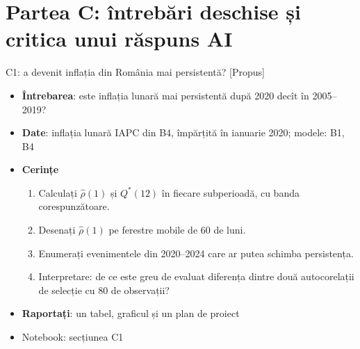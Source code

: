 \section{Partea C: întrebări deschise și critica unui răspuns AI}

\begin{frame}{C1: a devenit inflația din România mai persistentă? [Propus]}
\itemsize{\footnotesize}
\begin{itemize}
\item \textbf{Întrebarea}: este inflația lunară mai persistentă după 2020 decît în 2005--2019?
\item \textbf{Date}: inflația lunară IAPC din B4, împărțită în ianuarie 2020; modele: B1, B4
\item \textbf{Cerințe}
\begin{enumerate}
    \item Calculați $\hat\rho(1)$ și $Q^*(12)$ în fiecare subperioadă, cu banda corespunzătoare.
    \item Desenați $\hat\rho(1)$ pe ferestre mobile de 60 de luni.
    \item Enumerați evenimentele din 2020--2024 care ar putea schimba persistența.
    \item Interpretare: de ce este greu de evaluat diferența dintre două autocorelații de selecție cu 80 de observații?
\end{enumerate}
\item \textbf{Raportați}: un tabel, graficul și un plan de proiect
\item Notebook: secțiunea C1
\end{itemize}
\end{frame}

